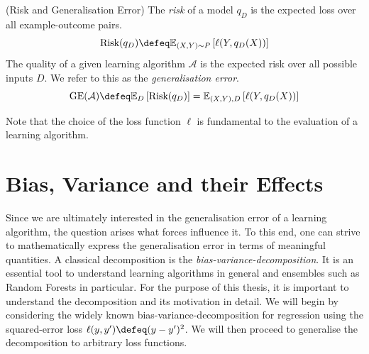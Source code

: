 \documentclass[
	twoside=false, %
]{kaobook}
\begin{document}
\begin{definition} (Risk and Generalisation Error)
The \textit{risk} of a model $q_D$ is the expected loss over all example-outcome pairs.
$$
\text{Risk}(q_{D}) \defeq \mathbb{E}_{(X,Y)\sim P}\left[ \ell(Y, q_{D}(X)) \right] 
$$
%
The quality of a given learning algorithm $\mathcal{A}$ is the expected risk over all possible inputs $D$. We refer to this as the \textit{generalisation error}. 
$$
\text{GE}(\mathcal{A}) \defeq \mathbb{E}_{D}\left[ \text{Risk}(q_{D}) \right]  = \mathbb{E}_{(X,Y), D}\left[ \ell(Y, q_{D}(X)) \right] 
$$
\end{definition}
Note that the choice of the loss function $\ell$ is fundamental to the evaluation of a learning algorithm.

\section{Bias, Variance and their Effects}
 \label{sec:bias-variance-effects}

Since we are ultimately interested in the generalisation error of a learning algorithm, the question arises what forces influence it. To this end, one can strive to mathematically express the generalisation error in terms of meaningful quantities. A classical decomposition is the \textit{bias-variance-decomposition}. 
It is an essential tool to understand learning algorithms in general and ensembles such as Random Forests in particular. For the purpose of this thesis, it is important to understand the decomposition and its motivation in detail. 
We will begin by considering the widely known bias-variance-decomposition for regression using the squared-error loss $\ell(y, y') \defeq (y- y')^2$. We will then proceed to generalise the decomposition to arbitrary loss functions.
\end{document}
